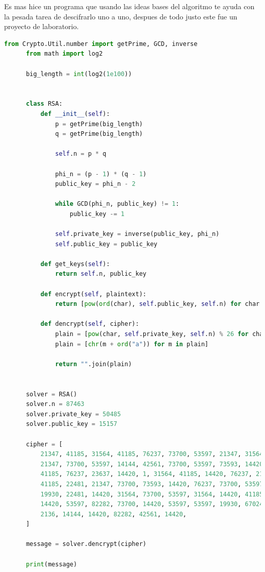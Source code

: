 \documentclass[12pt, fleqn]{report}                             %
\theoremstyle{break}                                            %
\begin{document}
    Es mas hice un programa que usando las ideas bases del algoritmo te ayuda con la pesada tarea de 
    descifrarlo uno a uno, despues de todo justo este fue un proyecto de laboratorio.

    \begin{lstlisting}[language=Python, gobble=6, basicstyle=\ttfamily\bfseries\scriptsize]
      from Crypto.Util.number import getPrime, GCD, inverse
      from math import log2

      big_length = int(log2(1e100))


      class RSA:
          def __init__(self):
              p = getPrime(big_length)
              q = getPrime(big_length)

              self.n = p * q

              phi_n = (p - 1) * (q - 1)
              public_key = phi_n - 2

              while GCD(phi_n, public_key) != 1:
                  public_key -= 1

              self.private_key = inverse(public_key, phi_n)
              self.public_key = public_key

          def get_keys(self):
              return self.n, public_key

          def encrypt(self, plaintext):
              return [pow(ord(char), self.public_key, self.n) for char in plaintext]

          def dencrypt(self, cipher):
              plain = [pow(char, self.private_key, self.n) % 26 for char in cipher]
              plain = [chr(m + ord("a")) for m in plain]

              return "".join(plain)


      solver = RSA()
      solver.n = 87463
      solver.private_key = 50485
      solver.public_key = 15157

      cipher = [
          21347, 41185, 31564, 41185, 76237, 73700, 53597, 21347, 31564, 73700,
          21347, 73700, 53597, 14144, 42561, 73700, 53597, 73593, 14420, 76237,
          41185, 76237, 23637, 14420, 1, 31564, 41185, 14420, 76237, 2136,
          41185, 22481, 21347, 73700, 73593, 14420, 76237, 73700, 53597, 82282,
          19930, 22481, 14420, 31564, 73700, 53597, 31564, 14420, 41185, 76237,
          14420, 53597, 82282, 73700, 14420, 53597, 53597, 19930, 67024, 14144,
          2136, 14144, 14420, 82282, 42561, 14420,
      ]

      message = solver.dencrypt(cipher)

      print(message)

      \end{lstlisting}
\end{document}
